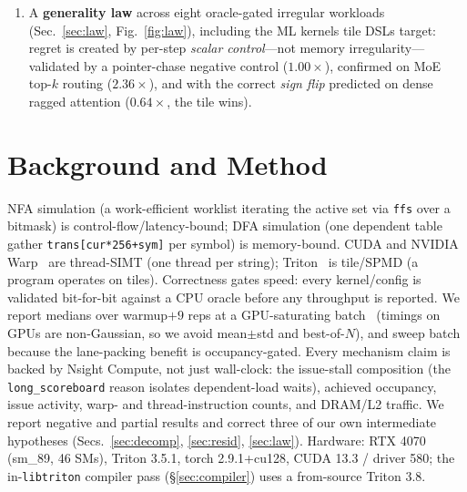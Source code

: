 \documentclass[conference]{IEEEtran}
\begin{document}
\begin{enumerate}
\emph{automatic} detect-and-lower selector that routes the detected region to the thread cure for
$3.9\times$ (negative-control kernels stay on the tile path); a real in-compiler rewrite built into
\texttt{libtriton} (reduce-hoist, $1.55\times$, oracle-correct); \textbf{and the full per-lane retirement
cure, built below the tile IR}---a \mbox{TritonGPU$\rightarrow$LLVM} pass wired into \texttt{make\_llir},
oracle-correct and \textbf{$4.15\times$} ($39\times$ fewer issued instructions, $2.5$--$7.3\times$ across
trip distributions), closing the residual by construction.
\item A \textbf{generality law} across eight oracle-gated irregular workloads (Sec.~\ref{sec:law},
Fig.~\ref{fig:law}), including the ML kernels tile DSLs target: regret is created by per-step
\emph{scalar control}---not memory irregularity---validated by a pointer-chase negative control
($1.00\times$), confirmed on MoE top-$k$ routing ($2.36\times$), and with the correct \emph{sign flip}
predicted on dense ragged attention ($0.64\times$, the tile wins).
\end{enumerate}

\section{Background and Method}
NFA simulation (a work-efficient worklist iterating the active set via \texttt{ffs} over a bitmask) is
control-flow/latency-bound; DFA simulation (one dependent table gather \texttt{trans[cur*256+sym]} per
symbol) is memory-bound. CUDA and NVIDIA Warp~\cite{warp2022} are thread-SIMT (one thread per string);
Triton~\cite{triton2019} is tile/SPMD (a program operates on tiles). Correctness gates speed: every
kernel/config is validated bit-for-bit against a CPU oracle before any throughput is reported. We
report medians over warmup${+}9$ reps at a GPU-saturating batch~\cite{hoefler2015} (timings on GPUs
are non-Gaussian, so we avoid mean$\pm$std and best-of-$N$), and sweep batch because the lane-packing
benefit is occupancy-gated. Every mechanism claim is backed by Nsight Compute, not just wall-clock:
the issue-stall composition (the \texttt{long\_scoreboard} reason isolates dependent-load waits),
achieved occupancy, issue activity, warp- and thread-instruction counts, and DRAM/L2 traffic. We report negative and partial results and correct
three of our own intermediate hypotheses (Secs.~\ref{sec:decomp}, \ref{sec:resid}, \ref{sec:law}).
Hardware: RTX 4070 (sm\_89, 46 SMs), Triton 3.5.1, torch 2.9.1+cu128, CUDA 13.3 / driver 580; the
in-\texttt{libtriton} compiler pass (\S\ref{sec:compiler}) uses a from-source Triton 3.8.
\end{document}

